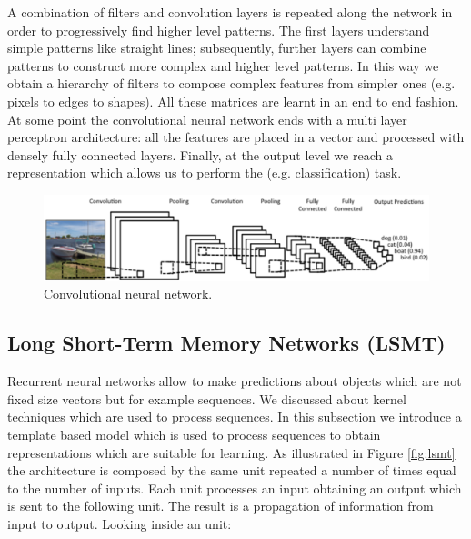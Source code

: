 A combination of filters and convolution layers is repeated along the network in order to progressively find higher level patterns. The first layers understand simple patterns like straight lines; subsequently, further layers can combine patterns to construct more complex and higher level patterns. In this way we obtain a hierarchy of filters to compose complex features from simpler ones (e.g. pixels to edges to shapes). All these matrices are learnt in an end to end fashion. \\
At some point the convolutional neural network ends with a multi layer perceptron architecture: all the features are placed in a vector and processed with densely fully connected layers. Finally, at the output level we reach a representation which allows us to perform the (e.g. classification) task.

\begin{figure}
    \centering
    \includegraphics[width=\textwidth]{images/cnn.png}
    \caption{Convolutional neural network.}
    \label{fig:cnn}
\end{figure}

\subsection{Long Short-Term Memory Networks (LSMT)}
Recurrent neural networks allow to make predictions about objects which are not fixed size vectors but for example sequences. We discussed about kernel techniques which are used to process sequences. In this subsection we introduce a template based model which is used to process sequences to obtain representations which are suitable for learning. As illustrated in Figure \ref{fig:lsmt} the architecture is composed by the same unit repeated a number of times equal to the number of inputs. Each unit processes an input obtaining an output which is sent to the following unit. The result is a propagation of information from input to output. Looking inside an unit:

